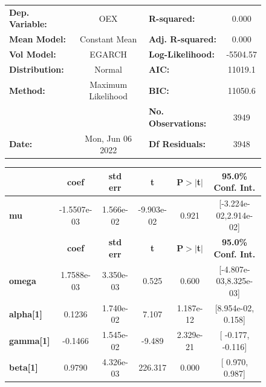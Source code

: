 \documentclass[a4paper, oneside]{discothesis}
\begin{document}
\begin{figure}
\begin{multicols}{2}
{  
\begin{center}
\begin{tabular}{lclc}
\toprule
\textbf{Dep. Variable:} &         OEX        & \textbf{  R-squared:         } &     0.000   \\
\textbf{Mean Model:}    &   Constant Mean    & \textbf{  Adj. R-squared:    } &     0.000   \\
\textbf{Vol Model:}     &       EGARCH       & \textbf{  Log-Likelihood:    } &   -5504.57  \\
\textbf{Distribution:}  &       Normal       & \textbf{  AIC:               } &    11019.1  \\
\textbf{Method:}        & Maximum Likelihood & \textbf{  BIC:               } &    11050.6  \\
\textbf{}               &                    & \textbf{  No. Observations:  } &    3949     \\
\textbf{Date:}          &  Mon, Jun 06 2022  & \textbf{  Df Residuals:      } &    3948     \\
\bottomrule
\end{tabular}
\begin{tabular}{lccccc}
            & \textbf{coef} & \textbf{std err} & \textbf{t} & \textbf{P$> |$t$|$} & \textbf{95.0\% Conf. Int.}  \\
\midrule
\textbf{mu} &  -1.5507e-03  &    1.566e-02     & -9.903e-02 &          0.921       &   [-3.224e-02,2.914e-02]    \\
                  & \textbf{coef} & \textbf{std err} & \textbf{t} & \textbf{P$> |$t$|$} & \textbf{95.0\% Conf. Int.}  \\
\midrule
\textbf{omega}    &   1.7588e-03  &    3.350e-03     &     0.525  &          0.600       &   [-4.807e-03,8.325e-03]    \\
\textbf{alpha[1]} &       0.1236  &    1.740e-02     &     7.107  &      1.187e-12       &    [8.954e-02,  0.158]      \\
\textbf{gamma[1]} &      -0.1466  &    1.545e-02     &    -9.489  &      2.329e-21       &     [ -0.177, -0.116]       \\
\textbf{beta[1]}  &       0.9790  &    4.326e-03     &   226.317  &        0.000         &     [  0.970,  0.987]       \\
\bottomrule
\end{tabular}
\end{center}

}
\end{multicols}
\end{figure}
\end{document}
